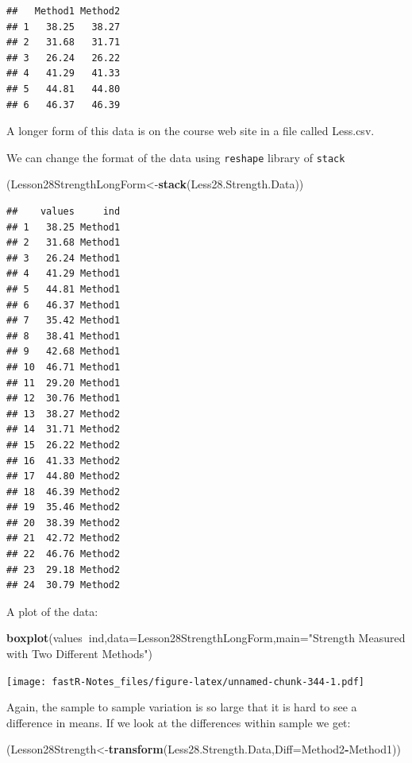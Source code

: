 \documentclass[]{book}
\newenvironment{Shaded}{\begin{snugshade}}{\end{snugshade}}
\newcommand{\KeywordTok}[1]{\textcolor[rgb]{0.13,0.29,0.53}{\textbf{#1}}}
\newcommand{\DataTypeTok}[1]{\textcolor[rgb]{0.13,0.29,0.53}{#1}}
\newcommand{\StringTok}[1]{\textcolor[rgb]{0.31,0.60,0.02}{#1}}
\newcommand{\OperatorTok}[1]{\textcolor[rgb]{0.81,0.36,0.00}{\textbf{#1}}}
\newcommand{\NormalTok}[1]{#1}
\theoremstyle{definition}
\theoremstyle{definition}
\theoremstyle{definition}
\theoremstyle{remark}
\begin{document}
\begin{verbatim}
##   Method1 Method2
## 1   38.25   38.27
## 2   31.68   31.71
## 3   26.24   26.22
## 4   41.29   41.33
## 5   44.81   44.80
## 6   46.37   46.39
\end{verbatim}

A longer form of this data is on the course web site in a file called
Less.csv.

We can change the format of the data using \texttt{reshape} library of
\texttt{stack}

\begin{Shaded}
\begin{Highlighting}[]
\NormalTok{(Lesson28StrengthLongForm<-}\KeywordTok{stack}\NormalTok{(Less28.Strength.Data))}
\end{Highlighting}
\end{Shaded}

\begin{verbatim}
##    values     ind
## 1   38.25 Method1
## 2   31.68 Method1
## 3   26.24 Method1
## 4   41.29 Method1
## 5   44.81 Method1
## 6   46.37 Method1
## 7   35.42 Method1
## 8   38.41 Method1
## 9   42.68 Method1
## 10  46.71 Method1
## 11  29.20 Method1
## 12  30.76 Method1
## 13  38.27 Method2
## 14  31.71 Method2
## 15  26.22 Method2
## 16  41.33 Method2
## 17  44.80 Method2
## 18  46.39 Method2
## 19  35.46 Method2
## 20  38.39 Method2
## 21  42.72 Method2
## 22  46.76 Method2
## 23  29.18 Method2
## 24  30.79 Method2
\end{verbatim}

A plot of the data:

\begin{Shaded}
\begin{Highlighting}[]
\KeywordTok{boxplot}\NormalTok{(values}\OperatorTok{~}\NormalTok{ind,}\DataTypeTok{data=}\NormalTok{Lesson28StrengthLongForm,}\DataTypeTok{main=}\StringTok{"Strength Measured with Two Different Methods"}\NormalTok{)}
\end{Highlighting}
\end{Shaded}

\texttt{[image: fastR-Notes\_files/figure-latex/unnamed-chunk-344-1.pdf]}

Again, the sample to sample variation is so large that it is hard to see
a difference in means. If we look at the differences within sample we
get:

\begin{Shaded}
\begin{Highlighting}[]
\NormalTok{(Lesson28Strength<-}\KeywordTok{transform}\NormalTok{(Less28.Strength.Data,}\DataTypeTok{Diff=}\NormalTok{Method2}\OperatorTok{-}\NormalTok{Method1))}
\end{Highlighting}
\end{Shaded}
\end{document}
